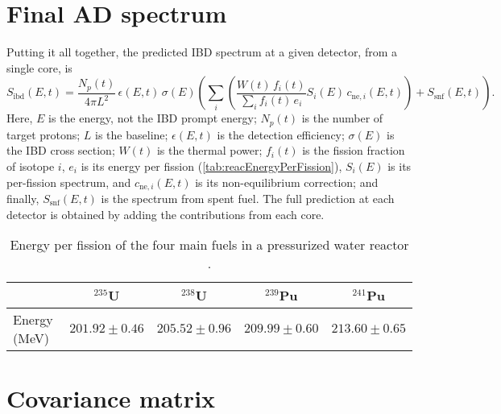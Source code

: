 \documentclass[../thesis.tex]{subfiles}
\begin{document}

\section{Final AD spectrum}
\label{sec:adspectra}

Putting it all together, the predicted IBD spectrum at a given detector, from a single core, is
\begin{equation}
  S_{\mathrm{ibd}}(E, t) = \frac{N_p(t)}{4\pi L^2} \, \epsilon(E, t) \,
    \sigma(E) \left( \sum_i \left( \frac{W(t) \, f_i(t)}{\sum_i f_i(t) \, e_i}
        S_i(E) \, c_{\mathrm{ne},i}(E, t) \right) + S_{\mathrm{snf}}(E, t)
    \right).
\end{equation}
Here, $E$ is the \nubar energy, not the IBD prompt energy; $N_p(t)$ is the number of target protons; $L$ is the baseline; $\epsilon(E, t)$ is the detection efficiency; $\sigma(E)$ is the IBD cross section; $W(t)$ is the thermal power; $f_i(t)$ is the fission fraction of isotope $i$, $e_i$ is its energy per fission (\autoref{tab:reacEnergyPerFission}), $S_i(E)$ is its per-fission spectrum, and $c_{\mathrm{ne},i}(E, t)$ is its non-equilibrium correction; and finally, $S_\mathrm{snf}(E, t)$ is the spectrum from spent fuel. The full prediction at each detector is obtained by adding the contributions from each core.

\begin{table}[ht]
  \begin{tabular}{lcccc}
    \toprule
    & $^{235}$U & $^{238}$U & $^{239}$Pu & $^{241}$Pu \\
    \midrule
    Energy (MeV) & $201.92 \pm 0.46$ & $205.52 \pm 0.96$ & $209.99 \pm 0.60$ & $213.60 \pm 0.65$ \\
    \bottomrule
  \end{tabular}
  \caption{Energy per fission of the four main fuels in a pressurized water reactor \cite{Kopeikin_2004}.}
  \label{tab:reacEnergyPerFission}
\end{table}

\section{Covariance matrix}
\label{sec:reacunccorr}
\end{document}
